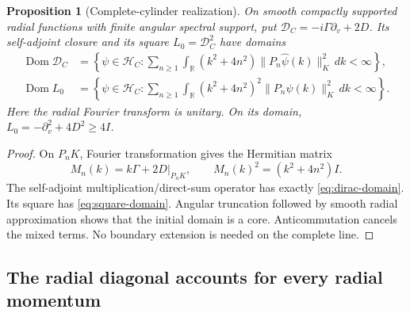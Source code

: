 \documentclass[11pt,letterpaper]{article}
\numberwithin{equation}{section}
\newtheorem{proposition}[theorem]{Proposition}
\theoremstyle{remark}
\DeclareMathOperator{\Dom}{Dom}
\newcommand{\R}{\mathbb R}
\newcommand{\dd}{\,d}
\newcommand{\hc}{\mathcal H_C}
\newcommand{\dc}{\mathcal D_C}
\begin{document}
\begin{proposition}[Complete-cylinder realization]\label{prop:domain}
On smooth compactly supported radial functions with finite angular
spectral support, put
\(\dc=-i\Gamma\partial_v+2D\). Its self-adjoint closure and its square
\(L_0=\dc^2\) have domains
\begin{align}
 \Dom\dc&=\left\{\psi\in\hc:
 \sum_{n\ge1}\int_\R(k^2+4n^2)\|P_n\widehat\psi(k)\|_K^2\dd k<\infty
 \right\}, \label{eq:dirac-domain}\\
 \Dom L_0&=\left\{\psi\in\hc:
 \sum_{n\ge1}\int_\R(k^2+4n^2)^2\|P_n\widehat\psi(k)\|_K^2\dd k<\infty
 \right\}. \label{eq:square-domain}
\end{align}
Here the radial Fourier transform is unitary. On its domain,
\(L_0=-\partial_v^2+4D^2\ge4I\).
\end{proposition}
\begin{proof}
On \(P_nK\), Fourier transformation gives the Hermitian matrix
\[
 M_n(k)=k\Gamma+2D|_{P_nK},\qquad M_n(k)^2=(k^2+4n^2)I.
\]
The self-adjoint multiplication/direct-sum operator has exactly
\eqref{eq:dirac-domain}. Its square has \eqref{eq:square-domain}.
Angular truncation followed by smooth radial approximation shows
that the initial domain is a core. Anticommutation cancels the mixed
terms. No boundary extension is needed on the complete line.
\end{proof}

\subsection{The radial diagonal accounts for every radial momentum}
\end{document}
